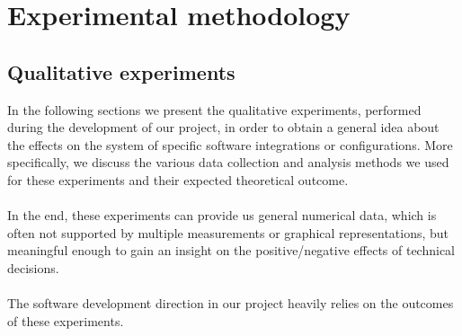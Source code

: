 \chapter{Experimental methodology}
\label{cap:experimental-methodology}


\section{Qualitative experiments}
In the following sections we present the qualitative experiments, performed during the development of our project, in order to obtain a general idea about the effects on the system of specific software integrations or configurations. More specifically, we discuss the various data collection and analysis methods we used for these experiments and their expected theoretical outcome. \\ \\
In the end, these experiments can provide us general numerical data, which is often not supported by multiple measurements or graphical representations, but meaningful enough to gain an insight on the positive/negative effects of technical decisions. \\ \\
The software development direction in our project heavily relies on the outcomes of these experiments.

